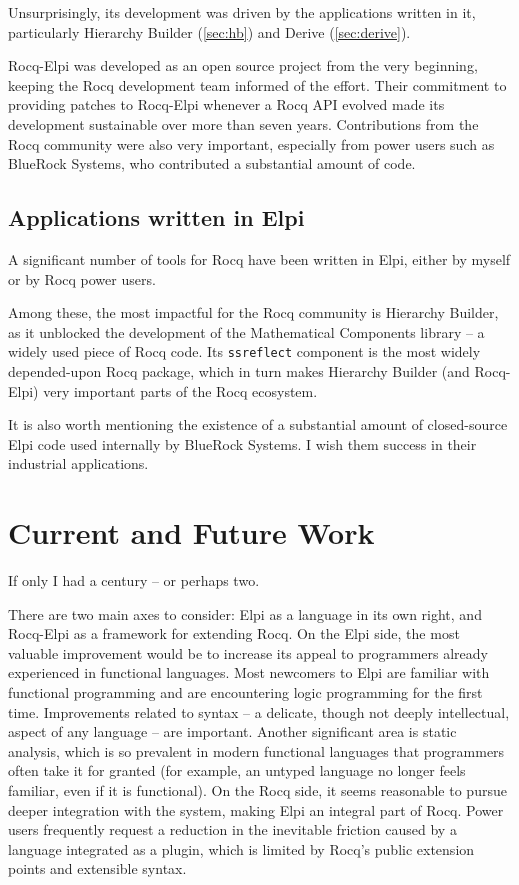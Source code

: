\documentclass{these-ISSS}
\begin{document}
Unsurprisingly, its development was driven by the applications written in it,
particularly Hierarchy Builder (\cref{sec:hb}) and Derive (\cref{sec:derive}).

Rocq-Elpi was developed as an open source project from the very beginning,
keeping the Rocq development team informed of the effort. Their commitment to
providing patches to Rocq-Elpi whenever a Rocq API evolved made its development
sustainable over more than seven years. Contributions from the Rocq community
were also very important, especially from power users such as BlueRock Systems,
who contributed a substantial amount of code.

\subsection{Applications written in Elpi}

A significant number of tools for Rocq have been written in Elpi, either by
myself or by Rocq power users.

Among these, the most impactful for the Rocq community is Hierarchy Builder, as
it unblocked the development of the Mathematical Components library -- a
widely used piece of Rocq code. Its \texttt{ssreflect} component is the most widely
depended-upon Rocq package, which in turn makes Hierarchy Builder (and
Rocq-Elpi) very important parts of the Rocq ecosystem.

It is also worth mentioning the existence of a substantial amount of
closed-source Elpi code used internally by BlueRock Systems. I wish them
success in their industrial applications.

\section{Current and Future Work}

If only I had a century -- or perhaps two.

There are two main axes to consider: Elpi as a language in its own right, and
Rocq-Elpi as a framework for extending Rocq. On the Elpi side, the most
valuable improvement would be to increase its appeal to programmers already
experienced in functional languages. Most newcomers to Elpi are familiar with
functional programming and are encountering logic programming for the first
time. Improvements related to syntax -- a delicate, though not deeply
intellectual, aspect of any language -- are important. Another significant area
is static analysis, which is so prevalent in modern functional languages that
programmers often take it for granted (for example, an untyped language no
longer feels familiar, even if it is functional). On the Rocq side, it seems
reasonable to pursue deeper integration with the system, making Elpi an
integral part of Rocq. Power users frequently request a reduction in the
inevitable friction caused by a language integrated as a plugin, which is
limited by Rocq’s public extension points and extensible syntax.
\end{document}
